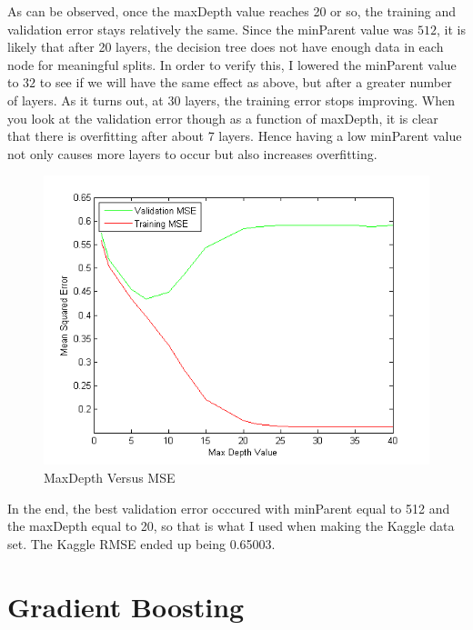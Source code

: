 \documentclass[twoside,11pt]{article}
\theoremstyle{definition}
\begin{document}
As can be observed, once the maxDepth value reaches 20 or so, the training and validation error stays relatively the same. Since the minParent value was $512$, it is likely that after 20 layers, the decision tree does not have enough data in each node for meaningful splits. In order to verify this, I lowered the minParent value to $32$ to see if we will have the same effect as above, but after a greater number of layers. As it turns out, at 30 layers, the training error stops improving. When you look at the validation error though as a function of maxDepth, it is clear that there is overfitting after about 7 layers. Hence having a low minParent value not only causes more layers to occur but also increases overfitting.  \\
\begin{figure}[h]
\centering
\includegraphics[width=4 in]{maxDepthVersusMSE2.png}
\caption{MaxDepth Versus MSE}
\end{figure}

In the end, the best validation error occcured with minParent equal to 512 and the maxDepth equal to 20, so that is what I used when making the Kaggle data set. The Kaggle RMSE ended up being 0.65003. 

\newpage

\section*{Gradient Boosting}
\end{document}
